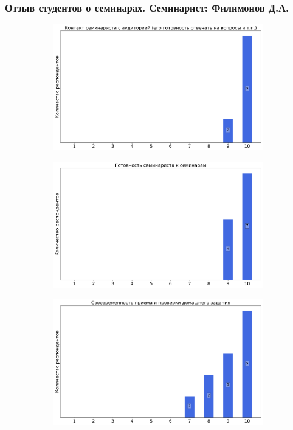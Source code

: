     \subsubsection{Отзыв студентов о семинарах. Семинарист: Филимонов Д.А.}
		\begin{figure}[H]
			\centering
			\begin{subfigure}[b]{0.45\textwidth}
				\centering
				\includegraphics[width=\textwidth]{images/3 course/ТФКП/seminarists-marks-Филимонов Д.А.-0.png}
			\end{subfigure}
			\begin{subfigure}[b]{0.45\textwidth}
				\centering
				\includegraphics[width=\textwidth]{images/3 course/ТФКП/seminarists-marks-Филимонов Д.А.-1.png}
			\end{subfigure}
			\begin{subfigure}[b]{0.45\textwidth}
				\centering
				\includegraphics[width=\textwidth]{images/3 course/ТФКП/seminarists-marks-Филимонов Д.А.-2.png}

\end{subfigure}
\end{figure}
